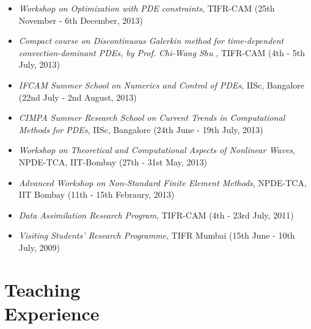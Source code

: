 \documentclass[margin]{res}
\begin{document}
\begin{resume}
\begin{itemize}
              \item{\it Workshop on Optimization with PDE constraints}, TIFR-CAM (25th November - 6th December, 2013)
   
               \item{\it Compact course on Discontinuous Galerkin method for time-dependent convection-dominant PDEs, by Prof. Chi-Wang Shu }, TIFR-CAM (4th - 5th July, 2013)
               
               
               \item{\it IFCAM Summer School on Numerics and Control of PDEs}, IISc, Bangalore (22nd July - 2nd August, 2013)
               
               \item{\it CIMPA Summer Research School on Current Trends in Computational Methods for PDEs}, IISc, Bangalore (24th June - 19th July, 2013)
               
               \item{\it Workshop on Theoretical and Computational Aspects of Nonlinear Waves}, \\NPDE-TCA, IIT-Bombay (27th - 31st May, 2013)

               \item{\it Advanced Workshop on Non-Standard Finite Element Methods}, NPDE-TCA, \\IIT Bombay (11th - 15th Febraury, 2013)

               \item{\it Data Assimilation Research Program}, TIFR-CAM (4th - 23rd July, 2011)

               \item{\it Visiting Students' Research Programme}, TIFR Mumbai (15th June - 10th July, 2009)
               \end{itemize}          
            
              
\section{Teaching \\Experience} 
   

\end{resume}
\end{document}
